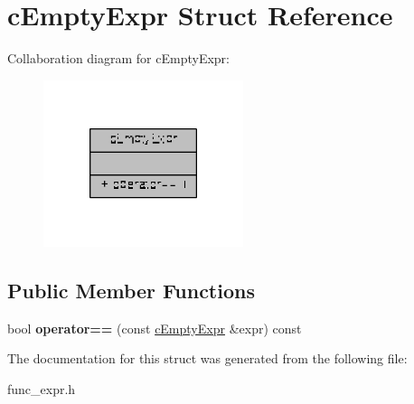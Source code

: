 \hypertarget{structcEmptyExpr}{\section{c\-Empty\-Expr Struct Reference}
\label{structcEmptyExpr}
}


Collaboration diagram for c\-Empty\-Expr\-:
\nopagebreak
\begin{figure}[H]
\begin{center}
\leavevmode
\includegraphics[width=166pt]{structcEmptyExpr__coll__graph}
\end{center}
\end{figure}
\subsection*{Public Member Functions}
\begin{DoxyCompactItemize}
\item 
\hypertarget{structcEmptyExpr_ae61fe1f368032f51d999710129c9434b}{bool {\bfseries operator==} (const \hyperlink{structcEmptyExpr}{c\-Empty\-Expr} \&expr) const }\label{structcEmptyExpr_ae61fe1f368032f51d999710129c9434b}

\end{DoxyCompactItemize}


The documentation for this struct was generated from the following file\-:\begin{DoxyCompactItemize}
\item 
func\-\_\-expr.\-h\end{DoxyCompactItemize}
